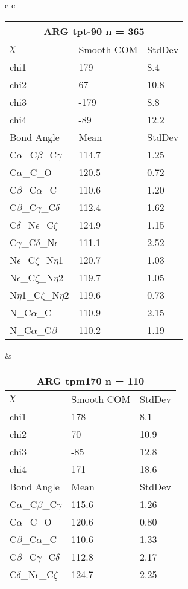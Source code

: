 \begin{longtable}{ c c }
  \begin{tabular}{ l l l }
  \toprule
  \multicolumn{3}{c}{ARG \textbf{tpt-90} n = 365} \\ \toprule
  $\chi$       & Smooth COM & StdDev \\ \midrule
  chi1 & 179 & 8.4 \\ 
  chi2 & 67 & 10.8 \\ 
  chi3 & -179 & 8.8 \\ 
  chi4 & -89 & 12.2 \\ \midrule
  Bond Angle   & Mean     & StdDev \\ \midrule
  C$\alpha$\_C$\beta$\_C$\gamma$ & 114.7 & 1.25\\
  C$\alpha$\_C\_O & 120.5 & 0.72\\
  C$\beta$\_C$\alpha$\_C & 110.6 & 1.20\\
  C$\beta$\_C$\gamma$\_C$\delta$ & 112.4 & 1.62\\
  C$\delta$\_N$\epsilon$\_C$\zeta$ & 124.9 & 1.15\\
  C$\gamma$\_C$\delta$\_N$\epsilon$ & 111.1 & 2.52\\
  N$\epsilon$\_C$\zeta$\_N$\eta$1 & 120.7 & 1.03\\
  N$\epsilon$\_C$\zeta$\_N$\eta$2 & 119.7 & 1.05\\
  N$\eta$1\_C$\zeta$\_N$\eta$2 & 119.6 & 0.73\\
  N\_C$\alpha$\_C & 110.9 & 2.15\\
  N\_C$\alpha$\_C$\beta$ & 110.2 & 1.19\\
  \bottomrule
  \end{tabular}
  &
  \begin{tabular}{ l l l }
  \toprule
  \multicolumn{3}{c}{ARG \textbf{tpm170} n = 110} \\ \toprule
  $\chi$       & Smooth COM & StdDev \\ \midrule
  chi1 & 178 & 8.1 \\ 
  chi2 & 70 & 10.9 \\ 
  chi3 & -85 & 12.8 \\ 
  chi4 & 171 & 18.6 \\ \midrule
  Bond Angle   & Mean     & StdDev \\ \midrule
  C$\alpha$\_C$\beta$\_C$\gamma$ & 115.6 & 1.26\\
  C$\alpha$\_C\_O & 120.6 & 0.80\\
  C$\beta$\_C$\alpha$\_C & 110.6 & 1.33\\
  C$\beta$\_C$\gamma$\_C$\delta$ & 112.8 & 2.17\\
  C$\delta$\_N$\epsilon$\_C$\zeta$ & 124.7 & 2.25\\

\end{tabular}
\end{longtable}
